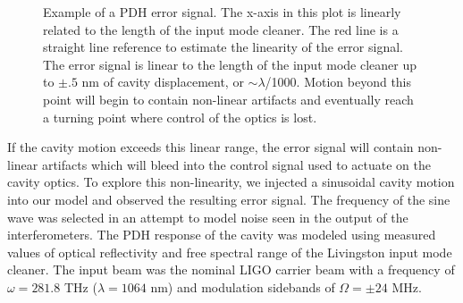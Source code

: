 \begin{figure}[h!]
\centering

\caption[Example of a PDH error signal]{Example of a PDH error signal. %
         The x-axis in this plot is linearly related to the length of the %
         input mode cleaner. 
         The red line is a straight line reference to estimate the linearity %
         of the error signal. %
         The error signal is linear to the length of the %
         input mode cleaner up to $\pm.5$ nm of cavity displacement, or %
         $\sim\lambda$/1000. Motion %
         beyond this point will begin to contain non-linear artifacts and %
         eventually reach a turning point where control of the optics is lost.}
\label{fig:pdh}
\end{figure}

If the cavity motion exceeds this linear range, the error signal will 
contain non-linear artifacts which will bleed into the control signal 
used to actuate on the cavity optics.
To explore this non-linearity, we injected a sinusoidal cavity motion into our 
model and observed the resulting error signal.
The frequency of the sine wave was selected in an attempt to model 
noise seen in the output of the interferometers.  
The PDH response of the cavity was modeled using measured values of optical 
reflectivity and free spectral range of the Livingston input mode cleaner. 
The input beam was the nominal LIGO carrier beam with a frequency of 
$\omega = 281.8$ THz ($\lambda = 1064$ nm) and modulation sidebands of 
$\Omega = \pm24$ MHz.


